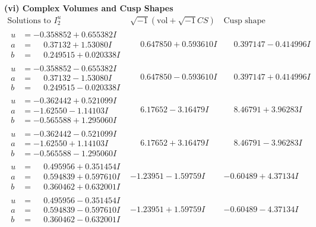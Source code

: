 \documentclass[1p]{elsarticle_modified}
\theoremstyle{definition}
\newcommand{\I}{\sqrt{-1}}
\begin{document}
\newpage\flushleft \textbf{(vi) Complex Volumes and Cusp Shapes}
$$\begin{array}{c|c|c}  
\text{Solutions to }I^u_{2}& \I (\text{vol} + \sqrt{-1}CS) & \text{Cusp shape}\\
 \hline 
\begin{aligned}
u &= -0.358852 + 0.655382 I \\
a &= \phantom{-}0.37132 + 1.53080 I \\
b &= \phantom{-}0.249515 + 0.020338 I\end{aligned}
 & \phantom{-}0.647850 + 0.593610 I & \phantom{-}0.397147 - 0.414996 I \\ \hline\begin{aligned}
u &= -0.358852 - 0.655382 I \\
a &= \phantom{-}0.37132 - 1.53080 I \\
b &= \phantom{-}0.249515 - 0.020338 I\end{aligned}
 & \phantom{-}0.647850 - 0.593610 I & \phantom{-}0.397147 + 0.414996 I \\ \hline\begin{aligned}
u &= -0.362442 + 0.521099 I \\
a &= -1.62550 - 1.14103 I \\
b &= -0.565588 + 1.295060 I\end{aligned}
 & \phantom{-}6.17652 - 3.16479 I & \phantom{-}8.46791 + 3.96283 I \\ \hline\begin{aligned}
u &= -0.362442 - 0.521099 I \\
a &= -1.62550 + 1.14103 I \\
b &= -0.565588 - 1.295060 I\end{aligned}
 & \phantom{-}6.17652 + 3.16479 I & \phantom{-}8.46791 - 3.96283 I \\ \hline\begin{aligned}
u &= \phantom{-}0.495956 + 0.351454 I \\
a &= \phantom{-}0.594839 + 0.597610 I \\
b &= \phantom{-}0.360462 + 0.632001 I\end{aligned}
 & -1.23951 - 1.59759 I & -0.60489 + 4.37134 I \\ \hline\begin{aligned}
u &= \phantom{-}0.495956 - 0.351454 I \\
a &= \phantom{-}0.594839 - 0.597610 I \\
b &= \phantom{-}0.360462 - 0.632001 I\end{aligned}
 & -1.23951 + 1.59759 I & -0.60489 - 4.37134 I \\ \hline\begin{aligned}

\end{aligned}
\end{array}$$
\end{document}
